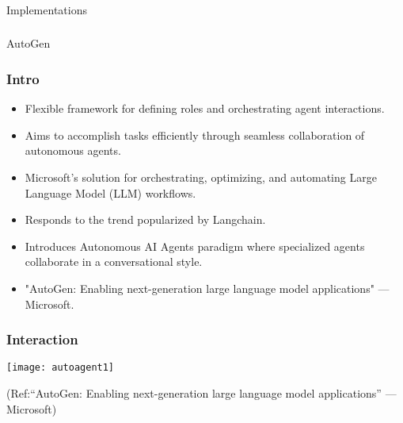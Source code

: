 \begin{frame}[fragile]\frametitle{}
\begin{center}
{\Large Implementations}
\end{center}
\end{frame}

\begin{frame}[fragile]\frametitle{}
\begin{center}
{\Large AutoGen}
\end{center}
\end{frame}

\begin{frame}[fragile]\frametitle{Intro}
  \begin{itemize}
    \item Flexible framework for defining roles and orchestrating agent interactions.
    \item Aims to accomplish tasks efficiently through seamless collaboration of autonomous agents.
    \item Microsoft's solution for orchestrating, optimizing, and automating Large Language Model (LLM) workflows.
    \item Responds to the trend popularized by Langchain.
    \item Introduces Autonomous AI Agents paradigm where specialized agents collaborate in a conversational style.
    \item "AutoGen: Enabling next-generation large language model applications" — Microsoft.
  \end{itemize}
\end{frame}

\begin{frame}[fragile]\frametitle{Interaction}
	
	\begin{center}
	\texttt{[image: autoagent1]}
	\end{center}
	
{\tiny (Ref:“AutoGen: Enabling next-generation large language model applications” — Microsoft)}
\end{frame}


